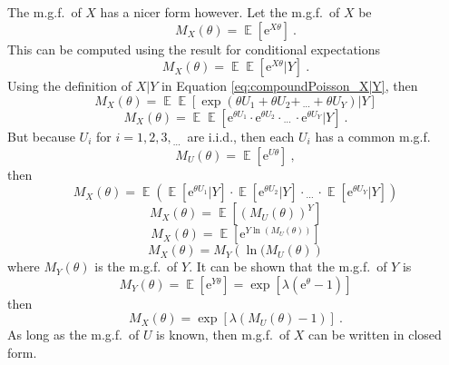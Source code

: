 \documentclass[12pt, a4paper]{memoir}
\DeclareMathOperator{\expectation}{\mathbb{E}}
\newcommand{\euler}{\mathrm{e}}
\newcommand{\dotdotdot}{_{\phantom{.}\cdots}}
\begin{document}
The m.g.f.~of $X$ has a nicer form however. Let the m.g.f.~of $X$ be
\begin{equation*}
M_X(\theta)=\expectation\left[\euler^{X\theta}\right] \ .
\end{equation*}
This can be computed using the result for conditional expectations
\begin{equation*}
M_X(\theta)=\expectation\expectation\left[\euler^{X\theta}|Y\right] \ .
\end{equation*}
Using the definition of $X|Y$ in Equation \eqref{eq:compoundPoisson_X|Y}, then
\begin{equation*}
M_X(\theta)=\expectation\expectation\left[\exp\left(\theta U_1 + \theta U_2 + \dotdotdot + \theta U_Y\right)|Y\right]
\end{equation*}
\begin{equation*}
M_X(\theta)=\expectation\expectation\left[\euler^{\theta U_1}\cdot\euler^{\theta U_2}\cdot\dotdotdot\cdot\euler^{\theta U_Y}|Y\right] \ .
\end{equation*}
But because $U_i$ for $i=1,2,3,\dotdotdot$ are i.i.d., then each $U_i$ has a common m.g.f.
\begin{equation*}
M_U(\theta)=\expectation\left[\euler^{U\theta}\right] \ ,
\end{equation*}
then
\begin{equation*}
M_X(\theta)=\expectation\left(
\expectation\left[\euler^{\theta U_1}|Y\right]\cdot
\expectation\left[\euler^{\theta U_2}|Y\right]\cdot
\dotdotdot \cdot
\expectation\left[\euler^{\theta U_Y}|Y\right]
\right)
\end{equation*}
\begin{equation*}
M_X(\theta)=\expectation\left[\left(M_U(\theta)\right)^Y\right]
\end{equation*}
\begin{equation*}
M_X(\theta)=\expectation\left[\euler^{Y\ln(M_U(\theta))}\right]
\end{equation*}
\begin{equation*}
M_X(\theta) = M_Y\left(\ln(M_U(\theta)\right)
\end{equation*}
where $M_Y(\theta)$ is the m.g.f.~of $Y$. It can be shown that the m.g.f.~of $Y$ is
\begin{equation}
M_Y(\theta)=\expectation\left[\euler^{Y\theta}\right]
=\exp\left[
\lambda\left(
\euler^\theta-1
\right)
\right]
\end{equation}
then
\begin{equation}
M_X(\theta)
=
\exp\left[
\lambda\left(
M_U(\theta)-1
\right)
\right] \ .
\end{equation}
As long as the m.g.f.~of $U$ is known, then m.g.f.~of $X$ can be written in closed form.
\end{document}
